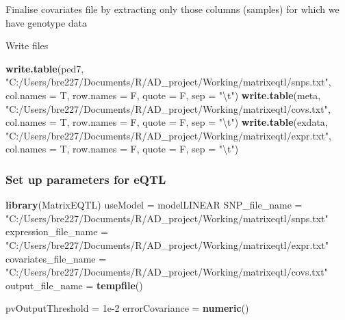\documentclass[]{article}
\newenvironment{Shaded}{\begin{snugshade}}{\end{snugshade}}
\newcommand{\KeywordTok}[1]{\textcolor[rgb]{0.13,0.29,0.53}{\textbf{#1}}}
\newcommand{\DataTypeTok}[1]{\textcolor[rgb]{0.13,0.29,0.53}{#1}}
\newcommand{\FloatTok}[1]{\textcolor[rgb]{0.00,0.00,0.81}{#1}}
\newcommand{\CharTok}[1]{\textcolor[rgb]{0.31,0.60,0.02}{#1}}
\newcommand{\StringTok}[1]{\textcolor[rgb]{0.31,0.60,0.02}{#1}}
\newcommand{\OperatorTok}[1]{\textcolor[rgb]{0.81,0.36,0.00}{\textbf{#1}}}
\newcommand{\NormalTok}[1]{#1}
\begin{document}
Finalise covariates file by extracting only those columns (samples) for
which we have genotype data

\begin{Shaded}
\end{Shaded}

Write files

\begin{Shaded}
\begin{Highlighting}[]
\KeywordTok{write.table}\NormalTok{(ped7, }\StringTok{"C:/Users/bre227/Documents/R/AD_project/Working/matrixeqtl/snps.txt"}\NormalTok{, }\DataTypeTok{col.names =}\NormalTok{ T, }\DataTypeTok{row.names =}\NormalTok{ F, }\DataTypeTok{quote =}\NormalTok{ F, }\DataTypeTok{sep =} \StringTok{"}\CharTok{\textbackslash{}t}\StringTok{"}\NormalTok{)}
\KeywordTok{write.table}\NormalTok{(meta, }\StringTok{"C:/Users/bre227/Documents/R/AD_project/Working/matrixeqtl/covs.txt"}\NormalTok{, }\DataTypeTok{col.names =}\NormalTok{ T, }\DataTypeTok{row.names =}\NormalTok{ F, }\DataTypeTok{quote =}\NormalTok{ F, }\DataTypeTok{sep =} \StringTok{"}\CharTok{\textbackslash{}t}\StringTok{"}\NormalTok{)}
\KeywordTok{write.table}\NormalTok{(exdata, }\StringTok{"C:/Users/bre227/Documents/R/AD_project/Working/matrixeqtl/expr.txt"}\NormalTok{, }\DataTypeTok{col.names =}\NormalTok{ T, }\DataTypeTok{row.names =}\NormalTok{ F, }\DataTypeTok{quote =}\NormalTok{ F, }\DataTypeTok{sep =} \StringTok{"}\CharTok{\textbackslash{}t}\StringTok{"}\NormalTok{)}
\end{Highlighting}
\end{Shaded}

\subsubsection{Set up parameters for
eQTL}\label{set-up-parameters-for-eqtl}

\begin{Shaded}
\begin{Highlighting}[]
\KeywordTok{library}\NormalTok{(MatrixEQTL)}
\NormalTok{useModel =}\StringTok{ }\NormalTok{modelLINEAR}
\NormalTok{SNP_file_name =}\StringTok{ "C:/Users/bre227/Documents/R/AD_project/Working/matrixeqtl/snps.txt"}
\NormalTok{expression_file_name =}\StringTok{ "C:/Users/bre227/Documents/R/AD_project/Working/matrixeqtl/expr.txt"}
\NormalTok{covariates_file_name =}\StringTok{ "C:/Users/bre227/Documents/R/AD_project/Working/matrixeqtl/covs.txt"}
\NormalTok{output_file_name =}\StringTok{ }\KeywordTok{tempfile}\NormalTok{()}

\NormalTok{pvOutputThreshold =}\StringTok{ }\FloatTok{1e-2}
\NormalTok{errorCovariance =}\StringTok{ }\KeywordTok{numeric}\NormalTok{()}
\end{Highlighting}
\end{Shaded}
\end{document}
